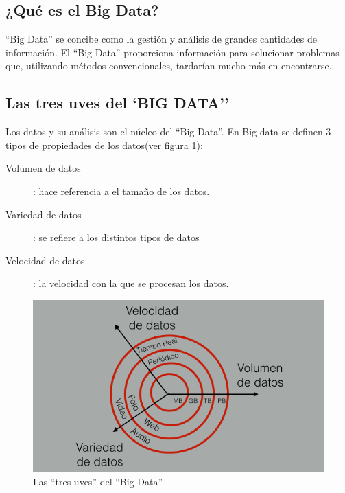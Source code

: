 \subsection{¿Qué es el Big Data?}

``Big Data'' se concibe como la gestión y análisis de grandes cantidades de información. El ``Big Data'' proporciona información para solucionar problemas que, utilizando métodos convencionales, tardarían mucho más en encontrarse.

\subsection{Las tres uves del `BIG DATA''}

Los datos y su análisis son el núcleo del ``Big Data''. En Big data se definen 3 tipos de propiedades de los datos(ver figura \ref{3vs}):

\begin{description}

\item [Volumen de datos]: hace referencia a el tamaño de los datos.

\item [Variedad de datos]: se refiere a los distintos tipos de datos

\item [Velocidad de datos]: la velocidad con la que se procesan los datos.

\end{description}

\begin{figure}
\begin{center}
\includegraphics[width=1.0\textwidth]{imagenes/3V.png}
\caption{Las ``tres uves'' del ``Big Data''}
\label{3vs}
\end{center}
\end{figure}

